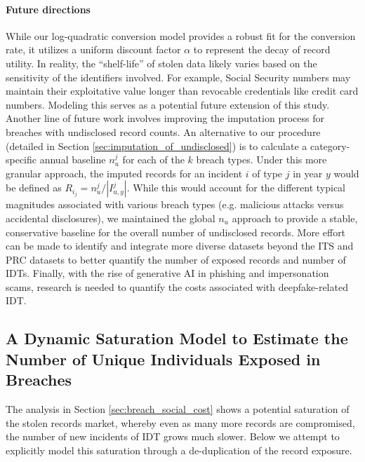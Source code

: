 \paragraph{Future directions}
While our log-quadratic conversion model provides a robust fit for the conversion rate, it utilizes a uniform discount factor $\alpha$ to represent the decay of record utility. In reality, the ``shelf-life'' of stolen data likely varies based on the sensitivity of the identifiers involved. For example, Social Security numbers may maintain their exploitative value longer than revocable credentials like credit card numbers. Modeling this serves as a potential future extension of this study. 
%
Another line of future work involves improving the imputation process for breaches with undisclosed record counts. An alternative to our procedure (detailed in Section \ref{sec:imputation_of_undisclosed}) is to calculate a category-specific annual baseline $n_u^j$ for each of the $k$ breach types. Under this more granular approach, the imputed records for an incident $i$ of type $j$ in year $y$ would be defined as $R_{i_j}=n_u^j/|I_{u,y}^j|$. While this would account for the different typical magnitudes associated with various breach types (e.g. malicious attacks versus accidental disclosures), we maintained the global $n_u$ approach to provide a stable, conservative baseline for the overall number of undisclosed records. 
%
More effort can be made to identify and integrate more diverse datasets beyond the ITS and PRC datasets to better quantify the number of exposed records and number of IDTs. Finally, with the rise of generative AI in phishing and impersonation scams, research is needed to quantify the costs associated with deepfake-related IDT.

\subsection{A Dynamic Saturation Model to Estimate the Number of Unique Individuals Exposed in Breaches}
\label{sec:estimating_number_records}

The analysis in Section \ref{sec:breach_social_cost} shows a potential saturation of the stolen records market, whereby even as many more records are compromised, the number of new incidents of IDT grows much slower. Below we attempt to explicitly model this saturation through a de-duplication of the record exposure.

